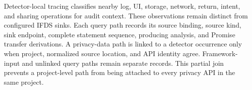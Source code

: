 Detector-local tracing classifies nearby log, UI, storage, network, return, intent, and sharing operations for audit context. These observations remain distinct from configured IFDS sinks. Each query path records its source binding, source kind, sink endpoint, complete statement sequence, producing analysis, and Promise transfer derivations. A privacy-data path is linked to a detector occurrence only when project, normalized source location, and API identity agree. Framework-input and unlinked query paths remain separate records. This partial join prevents a project-level path from being attached to every privacy API in the same project.
